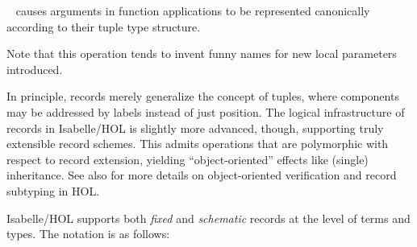 \begin{isabellebody}
\begin{isamarkuptext}
  \begin{description}

  \item \hyperlink{attribute.HOL.split-format}{\mbox{}}\  causes
  arguments in function applications to be represented canonically
  according to their tuple type structure.

  Note that this operation tends to invent funny names for new local
  parameters introduced.

  \end{description}%
\end{isamarkuptext}%
\isamarkuptrue%
%
\isamarkuptrue%
%
\begin{isamarkuptext}%
In principle, records merely generalize the concept of tuples, where
  components may be addressed by labels instead of just position.  The
  logical infrastructure of records in Isabelle/HOL is slightly more
  advanced, though, supporting truly extensible record schemes.  This
  admits operations that are polymorphic with respect to record
  extension, yielding ``object-oriented'' effects like (single)
  inheritance.  See also \cite{NaraschewskiW-TPHOLs98} for more
  details on object-oriented verification and record subtyping in HOL.%
\end{isamarkuptext}%
\isamarkuptrue%
%
\isamarkuptrue%
%
\begin{isamarkuptext}%
Isabelle/HOL supports both \emph{fixed} and \emph{schematic} records
  at the level of terms and types.  The notation is as follows:


\end{isamarkuptext}
\end{isabellebody}
